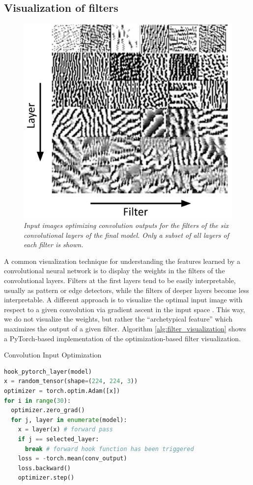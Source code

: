 \documentclass[a4paper]{article}
\begin{document}
\subsection{Visualization of filters}
\label{sec:filter_visualization}
\begin{figure}[t]
     \centering
     \includegraphics[width=.9\linewidth]{graphics/filters}
     \caption{\textit{Input images optimizing convolution outputs for the filters of the six convolutional layers of the final model. Only a subset of all layers of each filter is shown.}}
     \label{fig:filters}
\end{figure}
A common visualization technique for understanding the features learned by a convolutional neural network is to display the weights in the filters of the convolutional layers. Filters at the first layers tend to be easily interpretable, usually as pattern or edge detectors, while the filters of deeper layers become less interpretable. A different approach is to visualize the optimal input image with respect to a given convolution via gradient ascent in the input space \cite{Erhan2009}. This way, we do not visualize the weights, but rather the \enquote{archetypical feature} which maximizes the output of a given filter. Algorithm \ref{alg:filter_visualization} shows a PyTorch-based implementation of the optimization-based filter visualization.

\begin{algorithm}
     \caption{Convolution Input Optimization}\label{alg:filter_visualization}
     \begin{lstlisting}[language=Python]
hook_pytorch_layer(model)
x = random_tensor(shape=(224, 224, 3))
optimizer = torch.optim.Adam([x])
for i in range(30):
  optimizer.zero_grad()
  for j, layer in enumerate(model):
    x = layer(x) # forward pass
    if j == selected_layer:
      break # forward hook function has been triggered
    loss = -torch.mean(conv_output)
    loss.backward()
    optimizer.step()
     \end{lstlisting}
\end{algorithm}
\end{document}
